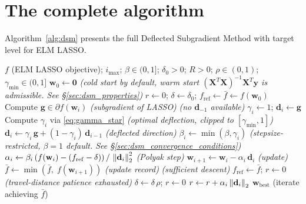 \section{The complete algorithm}
\label{sec:dsm_algorithm}

Algorithm~\ref{alg:dsm} presents the full Deflected Subgradient Method with target level for ELM LASSO.

\begin{algorithm}[htbp]
\caption{Deflected Subgradient with Target Level (SGPTL) for ELM LASSO~\cite[Slide 15]{frangioni-slides-nonsmooth}}
\label{alg:dsm}
\begin{algorithmic}[1]
\Require $f$ (ELM LASSO objective);\; $i_{\max}$;\; $\beta \in (0,1]$;\; $\delta_0 > 0$;\; $R > 0$;\; $\rho \in (0,1)$;\; $\gamma_{\min} \in (0,1]$
\State $\mathbf{w}_0 \gets \mathbf{0}$ \hfill\emph{(cold start by default, warm start $(\mathbf{X}^T\mathbf{X})^{-1}\mathbf{X}^T\mathbf{y}$ is admissible. See \S\ref{sec:dsm_properties})}
\State $r \gets 0$;\; $\delta \gets \delta_0$;\; $f_{\mathrm{ref}} \gets \bar{f} \gets f(\mathbf{w}_0)$
\State Compute $\mathbf{g} \in \partial f(\mathbf{w}_i)$ \hfill\emph{(subgradient of LASSO)}
 \hfill\emph{(no $\mathbf{d}_{-1}$ available)}
\State $\gamma_i \gets 1$;\; $\mathbf{d}_i \gets \mathbf{g}$
\Else
\State Compute $\gamma_i$ via \eqref{eq:gamma_star} \hfill\emph{(optimal deflection, clipped to $[\gamma_{\min},1]$)}
\State $\mathbf{d}_i \gets \gamma_i\, \mathbf{g} + (1-\gamma_i)\, \mathbf{d}_{i-1}$ \hfill\emph{(deflected direction)}
\EndIf
\State $\beta_i \gets \min(\beta,\gamma_i)$ \hfill\emph{(stepsize-restricted, $\beta=1$ default. See \S\ref{sec:dsm_convergence_conditions})}
\State $\alpha_i \gets \beta_i\,(f(\mathbf{w}_i) - (f_{\mathrm{ref}}-\delta))\,/\,\left\lVert \mathbf{d}_i \right\rVert_2^2$ \hfill\emph{(Polyak step)}
\State $\mathbf{w}_{i+1} \gets \mathbf{w}_i - \alpha_i\, \mathbf{d}_i$ \hfill\emph{(update)}
\State $\bar{f} \gets \min(\bar{f},\; f(\mathbf{w}_{i+1}))$ \hfill\emph{(update record)}
 \hfill\emph{(sufficient descent)}
\State $f_{\mathrm{ref}} \gets \bar{f}$;\; $r \gets 0$
 \hfill\emph{(travel-distance patience exhausted)}
\State $\delta \gets \delta\,\rho$;\; $r \gets 0$
\Else
\State $r \gets r + \alpha_i\left\lVert \mathbf{d}_i \right\rVert_2$
\EndIf
\EndFor
\State \Return $\mathbf{w}_{\mathrm{best}}$ (iterate achieving $\bar{f}$)
\end{algorithmic}
\end{algorithm}

